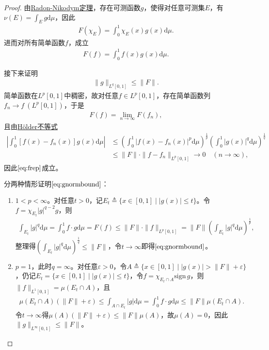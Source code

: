 \documentclass[../../main.tex]{subfiles}%
\begin{document}
\begin{proof}
由\hyperref[theorem:泛函分析--Radon-Nikodym定理]{Radon-Nikodym定理}，存在可测函数$g$，使得对任意可测集$E$，有$\nu(E)=\int_{E}g\mathrm{d}\mu$，因此
\begin{align*}
F(\chi_E)=\int_{0}^{1}\chi_E(x)g(x)\mathrm{d}\mu.
\end{align*}
进而对所有简单函数$f$，成立
\begin{align*}
F(f)=\int_{0}^{1}f(x)g(x)\mathrm{d}\mu.
\end{align*}

接下来证明
\begin{align}
\|g\|_{L^q[0,1]}\leqslant\|F\|.\label{eq:gnormbound}
\end{align}
简单函数在$L^p[0,1]$中稠密，故对任意$f\in L^p[0,1]$，存在简单函数列$f_n\to f\ (L^p[0,1])$，于是
\begin{align*}
F(f)=\lim\limits_{n\to\infty}F(f_n),
\end{align*}
且由\hyperref[Real-Analysis-theorem:实变函数--Hölder不等式]{Hölder不等式}
\begin{align*}
\left|\int_{0}^{1}[f(x)-f_n(x)]g(x)\mathrm{d}\mu\right|&\leqslant\left(\int_{0}^{1}|f(x)-f_n(x)|^p\mathrm{d}\mu\right)^{\frac{1}{p}}\left(\int_{0}^{1}|g(x)|^q\mathrm{d}\mu\right)^{\frac{1}{q}}\\
&\leqslant\|F\|\cdot\|f-f_n\|_{L^p[0,1]}\to0\quad(n\to\infty),
\end{align*}
因此$\eqref{eq:frep}$成立。

分两种情形证明$\eqref{eq:gnormbound}$：
\begin{enumerate}[(1)]
\item $1<p<\infty$。对任意$t>0$，记$E_t\triangleq\{x\in[0,1]\mid|g(x)|\leqslant t\}$。令$f=\chi_{E_t}|g|^{q-2}g$，则
\begin{align*}
\int_{E_t}|g|^q\mathrm{d}\mu=\int_{0}^{1}f\cdot g\mathrm{d}\mu=F(f)
\leqslant\|F\|\cdot\|f\|_{L^p[0,1]}=\|F\|\left(\int_{E_t}|g|^q\mathrm{d}\mu\right)^{\frac{1}{p}},
\end{align*}
整理得$\left(\int_{E_t}|g|^q\mathrm{d}\mu\right)^{\frac{1}{q}}\leqslant\|F\|$，令$t\to\infty$即得$\eqref{eq:gnormbound}$。

\item $p=1$，此时$q=\infty$。对任意$\varepsilon>0$，令$A\triangleq\{x\in[0,1]\mid|g(x)|>\|F\|+\varepsilon\}$，仍记$E_t=\{x\in[0,1]\mid|g(x)|\leqslant t\}$，令$f=\chi_{E_t\cap A}\mathrm{sign}\,g$，则$\|f\|_{L^1[0,1]}=\mu(E_t\cap A)$，且
\begin{align*}
\mu(E_t\cap A)(\|F\|+\varepsilon)\leqslant\int_{A\cap E_t}|g|\mathrm{d}\mu
=\int_{0}^{1}f\cdot g\mathrm{d}\mu\leqslant\|F\|\mu(E_t\cap A).
\end{align*}
令$t\to\infty$得$\mu(A)(\|F\|+\varepsilon)\leqslant\|F\|\mu(A)$，故$\mu(A)=0$，因此$\|g\|_{L^\infty[0,1]}\leqslant\|F\|$。
\end{enumerate}

\end{proof}
\end{document}
